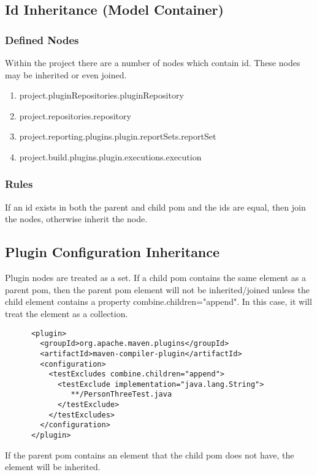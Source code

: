 \documentclass[12pt]{amsart}
\begin{document}
\subsection{Id Inheritance (Model Container)}

\subsubsection{Defined Nodes}
Within the project there are a number of nodes which contain id. These nodes may be inherited or even joined.
\begin{enumerate}
\item project.pluginRepositories.pluginRepository
\item project.repositories.repository
\item project.reporting.plugins.plugin.reportSets.reportSet
\item project.build.plugins.plugin.executions.execution
\end{enumerate}

\subsubsection{Rules}
If an id exists in both the parent and child pom and the ids are equal, then join the nodes, otherwise inherit the node. 

\subsection{Plugin Configuration Inheritance}
Plugin nodes are treated as a set. If a child pom contains the same element as a parent pom, then the parent pom element will not be inherited/joined unless the child element contains a property combine.children="append". In this case, it will treat the element as a collection.

\begin{verbatim}
      <plugin>
        <groupId>org.apache.maven.plugins</groupId>
        <artifactId>maven-compiler-plugin</artifactId>
        <configuration>
          <testExcludes combine.children="append">
            <testExclude implementation="java.lang.String">
               **/PersonThreeTest.java
            </testExclude>
          </testExcludes>
        </configuration>
      </plugin>
\end{verbatim}

If the parent pom contains an element that the child pom does not have, the element will be inherited.
\end{document}
